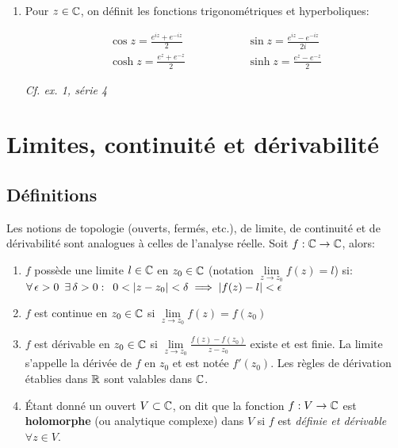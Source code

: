 \begin{example}
\begin{enumerate}[label=\arabic{enumi})]
    \item 
    Pour $z \in \mathbb{C}$, on définit les fonctions trigonométriques et hyperboliques:
    
    \begin{align*}
    \cos z = \frac{e^{iz} + e^{-iz}}{2}
    &\hspace{2cm} \sin z = \frac{e^{iz} - e^{-iz}}{2i}\\
    \cosh z = \frac{e^{z} + e^{-z}}{2}
    &\hspace{2cm} \sinh z = \frac{e^{z} - e^{-z}}{2}
    \end{align*}
    
    \textit{Cf. ex. 1, série 4}
\end{enumerate}
\end{example}


\section{Limites, continuité et dérivabilité}

\subsection{Définitions}

\begin{definition}[9.1, p.67]
    Les notions de topologie (ouverts, fermés, etc.), de limite, de continuité et de dérivabilité sont analogues à celles de l'analyse réelle.
    Soit $f: \mathbb{C} \rightarrow \mathbb{C}$, alors:
    
    \begin{enumerate}[label=\arabic{enumi})]
    \item 
    $f$ possède une limite $l \in \mathbb{C}$ en $z_0 \in \mathbb{C}$ (notation $\lim\limits_{z \rightarrow z_0} f(z) = l$) si:\\
    $\forall\, \epsilon > 0 \enspace \exists\, \delta > 0 :\enspace 0 < \left|z - z_0\right| < \delta \implies \left|f(z) - l\right| < \epsilon$
    
    \item 
    $f$ est continue en $z_0 \in \mathbb{C}$ si $\lim\limits_{z \rightarrow z_0} f(z) = f(z_0)$
    
    \item 
    $f$ est dérivable en $z_0 \in \mathbb{C}$ si $\lim\limits_{z \rightarrow z_0} \frac{f(z) - f(z_0)}{z - z_0}$ existe et est finie.
    La limite s'appelle la dérivée de $f$ en $z_0$ et est notée $f'(z_0)$.
    Les règles de dérivation établies dans $\mathbb{R}$ sont valables dans $\mathbb{C}$.
    
    \item 
    Étant donné un ouvert $V \subset \mathbb{C}$, on dit que la fonction $f: V \rightarrow \mathbb{C}$ est \textbf{holomorphe} (ou analytique complexe) dans $V$ si $f$ est \textit{définie et dérivable} $\forall z \in V$.
    \end{enumerate}
\end{definition}

